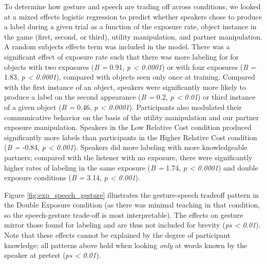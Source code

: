 \documentclass[10pt, letterpaper]{article}
\begin{document}
To determine how gesture and speech are trading off across conditions,
we looked at a mixed effects logistic regression to predict whether
speakers chose to produce a label during a given trial as a function of
the exposure rate, object instance in the game (first, second, or
third), utility manipulation, and partner manipulation. A random
subjects effects term was included in the model. There was a significant
effect of exposure rate such that there was more labeling for for
objects with two exposures (\emph{B =} 0.91, \emph{p \textless{}
0.0001}) or with four exposures (\emph{B =} 1.83, \emph{p \textless{}
0.0001}), compared with objects seen only once at training. Compared
with the first instance of an object, speakers were significantly more
likely to produce a label on the second appearance (\emph{B =} 0.2,
\emph{p \textless{} 0.01}) or third instance of a given object (\emph{B
=} 0.46, \emph{p \textless{} 0.0001}). Participants also modulated their
communicative behavior on the basis of the utility manipulation and our
partner exposure manipulation. Speakers in the Low Relative Cost
condition produced significantly more labels than participants in the
Higher Relative Cost condition (\emph{B =} -0.84, \emph{p \textless{}
0.001}). Speakers did more labeling with more knowledgeable partners;
compared with the listener with no exposure, there were significantly
higher rates of labeling in the same exposure (\emph{B =} 1.74, \emph{p
\textless{} 0.0001}) and double exposure conditions (\emph{B =} 3.14,
\emph{p \textless{} 0.001}).

Figure \ref{fig:exp_speech_gesture} illustrates the gesture-speech
tradeoff pattern in the Double Exposure condition (as there was minimal
teaching in that condition, so the speech-gesture trade-off is most
interpretable). The effects on gesture mirror those found for labeling
and are thus not included for brevity (\emph{ps \textless{} 0.01}). Note
that these effects cannot be explained by the degree of participant
knowledge; all patterns above hold when looking \emph{only} at words
known by the speaker at pretest (\emph{ps \textless{} 0.01}).
\end{document}
